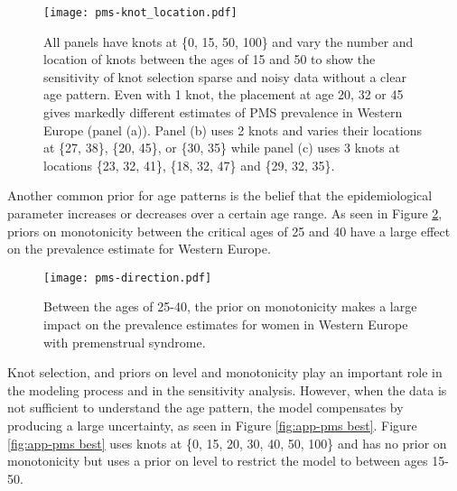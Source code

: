     \begin{figure}
        \begin{center}
            \texttt{[image: pms-knot\_location.pdf]}
        \end{center}
        \caption{All panels have knots at \{0, 15, 50, 100\} and vary
          the number and location of knots between the ages of 15 and
          50 to show the sensitivity of knot selection sparse and
          noisy data without a clear age pattern. Even with 1 knot,
          the placement at age 20, 32 or 45 gives markedly different
          estimates of PMS prevalence in Western Europe (panel (a)).
          Panel (b) uses 2 knots and varies their locations at \{27,
          38\}, \{20, 45\}, or \{30, 35\} while panel (c) uses 3 knots
          at locations \{23, 32, 41\}, \{18, 32, 47\} and \{29, 32,
          35\}.}
        \label{fig:app-pms knot_loc}
    \end{figure}

Another common prior for age patterns is the belief that the
epidemiological parameter increases or decreases over a certain age
range.  As seen in Figure \ref{fig:app-pms dir}, priors on
monotonicity between the critical ages of 25 and 40 have a large
effect on the prevalence estimate for Western Europe.

    \begin{figure}
        \begin{center}
            \texttt{[image: pms-direction.pdf]}
        \end{center}
        \caption{Between the ages of 25-40, the prior on monotonicity
          makes a large impact on the prevalence estimates for women
          in Western Europe with premenstrual syndrome.}
        \label{fig:app-pms dir}
    \end{figure}

Knot selection, and priors on level and monotonicity play an important
role in the modeling process and in the sensitivity analysis.  However,
when the data is not sufficient to understand the age pattern, the
model compensates by producing a large uncertainty, as seen in
Figure \ref{fig:app-pms best}.  Figure \ref{fig:app-pms best} uses knots
at \{0, 15, 20, 30, 40, 50, 100\} and has no prior on monotonicity but
uses a prior on level to restrict the model to between ages 15-50.

